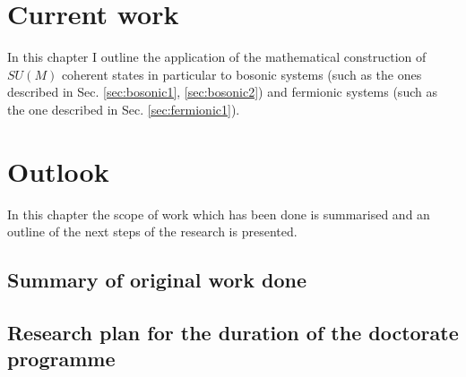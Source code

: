 \documentclass[12pt]{report}
\begin{document}
	
	
	
	
	
	
	
	
	
	
	
	
	
	
	\chapter{Current work}
	In this chapter I outline the application of the mathematical construction of $SU(M)$ coherent states in particular to bosonic systems (such as the ones described in Sec. \ref{sec:bosonic1}, \ref{sec:bosonic2}) and fermionic systems (such as the one described in Sec. \ref{sec:fermionic1}).
	
	
	
	
	
	
	
	
	
	\chapter{Outlook}
	
	In this chapter the scope of work which has been done is summarised and an outline of the next steps of the research is presented.
	
	\section{Summary of original work done}
	
	\section{Research plan for the duration of the doctorate programme}
	
	
	
\end{document}
